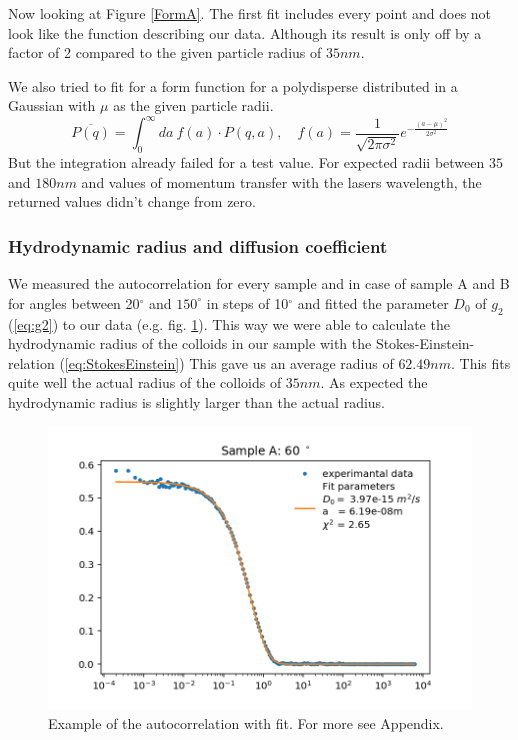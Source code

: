 \documentclass[]{article}
\begin{document}
Now looking at Figure \ref{FormA}. The first fit includes every point and does not look like the function describing our data. Although its result is only off by a factor of 2 compared to the given particle radius of $35nm$. 

We also tried to fit for a form function for a polydisperse distributed in a Gaussian with $\mu$ as the given particle radii. 
\[ \overline{P(q)} = \int_0^\infty da\: f(a)\cdot P(q,a) , \quad f(a)= \frac{1}{\sqrt{2 \pi \sigma^2}} e^{-\frac{(a-\mu)^2}{2 \sigma^2}} \]
But the integration already failed for a test value. For expected radii between $35$ and $180nm$ and values of momentum transfer with the lasers wavelength, the returned values didn't change from zero. 

\subsubsection{Hydrodynamic radius and diffusion coefficient}
We measured the autocorrelation for every sample and in case of sample A and B for angles between 20$^\circ$ and $150^\circ$ in steps of 10$^\circ$ and fitted the parameter $D_0$ of $g_2$ (\ref{eq:g2}) to our data (e.g. fig.  \ref{fig:Sample A 60}). This way we were able to calculate the hydrodynamic radius of the colloids in our sample with the Stokes-Einstein-relation (\ref{eq:StokesEinstein}) This gave us an average radius of $62.49 nm$. This fits quite well the actual radius of the colloids of $35nm$. As expected the  hydrodynamic radius is slightly larger than the actual radius. 



\begin{figure}
	\centering
	\includegraphics[width=0.7\linewidth]{Plots/A/60}
	\caption[Autocorrelation with fit of $g_2$]{}
	\caption{Example of the autocorrelation with fit. For more see Appendix.}
	\label{fig:Sample A 60}
\end{figure}
\end{document}
